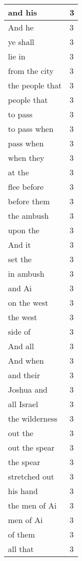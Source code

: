 \begin{center}
\begin{longtable}{|p{3.0in}|p{0.5in}|}
and his & 3\\ \hline 
And he & 3\\ \hline 
ye shall & 3\\ \hline 
lie in & 3\\ \hline 
from the city & 3\\ \hline 
the people that & 3\\ \hline 
people that & 3\\ \hline 
to pass & 3\\ \hline 
to pass when & 3\\ \hline 
pass when & 3\\ \hline 
when they & 3\\ \hline 
at the & 3\\ \hline 
flee before & 3\\ \hline 
before them & 3\\ \hline 
the ambush & 3\\ \hline 
upon the & 3\\ \hline 
And it & 3\\ \hline 
set the & 3\\ \hline 
in ambush & 3\\ \hline 
and Ai & 3\\ \hline 
on the west & 3\\ \hline 
the west & 3\\ \hline 
side of & 3\\ \hline 
And all & 3\\ \hline 
And when & 3\\ \hline 
and their & 3\\ \hline 
Joshua and & 3\\ \hline 
all Israel & 3\\ \hline 
the wilderness & 3\\ \hline 
out the & 3\\ \hline 
out the spear & 3\\ \hline 
the spear & 3\\ \hline 
stretched out & 3\\ \hline 
his hand & 3\\ \hline 
the men of Ai & 3\\ \hline 
men of Ai & 3\\ \hline 
of them & 3\\ \hline 
all that & 3\\ \hline 
\end{longtable}
\end{center}





